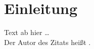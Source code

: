\section{Einleitung}\label{ch:Einleitung}
Text ab hier \ldots \\
Der Autor des Zitats \cite{Papula2006} heißt \citeauthor{Papula2006}.
